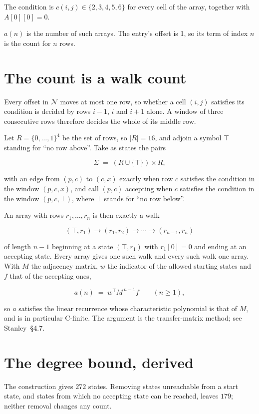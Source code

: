 \documentclass[11pt]{article}
\theoremstyle{definition}
\begin{document}
The condition is $c(i,j) \in \{2, 3, 4, 5, 6\}$ for every cell of the array, together with $A[0][0]=0$.

$a(n)$ is the number of such arrays. The entry's offset is 1, so its term of index $n$ is the count for $n$ rows.

\section{The count is a walk count}

Every offset in $\mathcal{N}$ moves at most one row, so whether a cell $(i,j)$ satisfies its condition is decided by rows $i-1$, $i$ and $i+1$ alone. A window of three consecutive rows therefore decides the whole of its middle row.

Let $R = \{0,\dots,1\}^{4}$ be the set of rows, so $|R| = 16$, and adjoin a symbol $\top$ standing for ``no row above''. Take as states the pairs

\[\Sigma \;=\; (R \cup \{\top\}) \times R,\]

with an edge from $(p,c)$ to $(c,x)$ exactly when row $c$ satisfies the condition in the window $(p,c,x)$, and call $(p,c)$ accepting when $c$ satisfies the condition in the window $(p,c,\bot)$, where $\bot$ stands for ``no row below''.

An array with rows $r_1,\dots,r_n$ is then exactly a walk

\[(\top,r_1) \to (r_1,r_2) \to \cdots \to (r_{n-1},r_n)\]

of length $n-1$ beginning at a state $(\top,r_1)$ with $r_1[0]=0$ and ending at an accepting state. Every array gives one such walk and every such walk one array. With $M$ the adjacency matrix, $w$ the indicator of the allowed starting states and $f$ that of the accepting ones,

\[a(n) \;=\; w^{\mathsf T} M^{\,n-1} f \qquad (n \ge 1),\]

so $a$ satisfies the linear recurrence whose characteristic polynomial is that of $M$, and is in particular C-finite. The argument is the transfer-matrix method; see Stanley~\S4.7.

\section{The degree bound, derived}

The construction gives $272$ states. Removing states unreachable from a start state, and states from which no accepting state can be reached, leaves $179$; neither removal changes any count.
\end{document}
